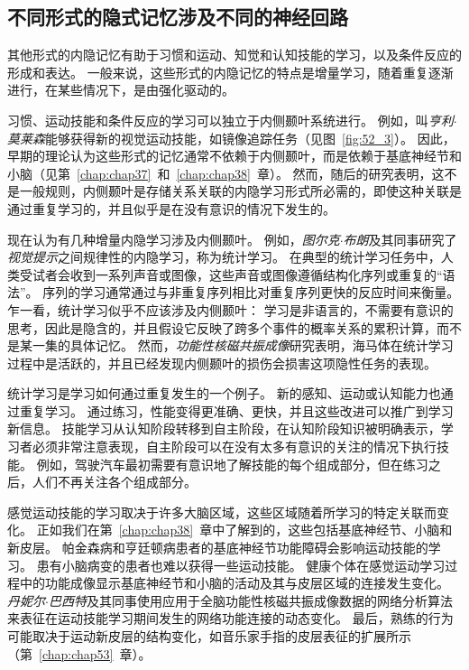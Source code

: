 \subsection{不同形式的隐式记忆涉及不同的神经回路}

其他形式的内隐记忆有助于习惯和运动、知觉和认知技能的学习，以及条件反应的形成和表达。
一般来说，这些形式的内隐记忆的特点是增量学习，随着重复逐渐进行，在某些情况下，是由强化驱动的。


习惯、运动技能和条件反应的学习可以独立于内侧颞叶系统进行。
例如，叫\textit{亨利$\cdot$莫莱森}能够获得新的视觉运动技能，如镜像追踪任务（见图~\ref{fig:52_3}）。
因此，早期的理论认为这些形式的记忆通常不依赖于内侧颞叶，而是依赖于基底神经节和小脑（见第~\ref{chap:chap37}~和~\ref{chap:chap38}~章）。
然而，随后的研究表明，这不是一般规则，内侧颞叶是存储关系关联的内隐学习形式所必需的，即使这种关联是通过重复学习的，并且似乎是在没有意识的情况下发生的。


现在认为有几种增量内隐学习涉及内侧颞叶。
例如，\textit{图尔克$\cdot$布朗}及其同事研究了\textit{视觉提示}之间规律性的内隐学习，称为统计学习。
在典型的统计学习任务中，人类受试者会收到一系列声音或图像，这些声音或图像遵循结构化序列或重复的“语法”。
序列的学习通常通过与非重复序列相比对重复序列更快的反应时间来衡量。
乍一看，统计学习似乎不应该涉及内侧颞叶：
学习是非语言的，不需要有意识的思考，因此是隐含的，并且假设它反映了跨多个事件的概率关系的累积计算，而不是某一集的具体记忆。
然而，\textit{功能性核磁共振成像}研究表明，海马体在统计学习过程中是活跃的，并且已经发现内侧颞叶的损伤会损害这项隐性任务的表现。


统计学习是学习如何通过重复发生的一个例子。
新的感知、运动或认知能力也通过重复学习。
通过练习，性能变得更准确、更快，并且这些改进可以推广到学习新信息。
技能学习从认知阶段转移到自主阶段，在认知阶段知识被明确表示，学习者必须非常注意表现，自主阶段可以在没有太多有意识的关注的情况下执行技能。
例如，驾驶汽车最初需要有意识地了解技能的每个组成部分，但在练习之后，人们不再关注各个组成部分。


感觉运动技能的学习取决于许多大脑区域，这些区域随着所学习的特定关联而变化。
正如我们在第~\ref{chap:chap38}~章中了解到的，这些包括基底神经节、小脑和新皮层。
帕金森病和亨廷顿病患者的基底神经节功能障碍会影响运动技能的学习。
患有小脑病变的患者也难以获得一些运动技能。
健康个体在感觉运动学习过程中的功能成像显示基底神经节和小脑的活动及其与皮层区域的连接发生变化。
\textit{丹妮尔$\cdot$巴西特}及其同事使用应用于全脑功能性核磁共振成像数据的网络分析算法来表征在运动技能学习期间发生的网络功能连接的动态变化。
最后，熟练的行为可能取决于运动新皮层的结构变化，如音乐家手指的皮层表征的扩展所示（第~\ref{chap:chap53}~章）。


